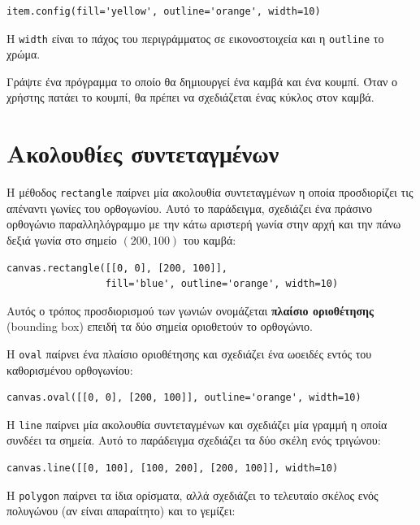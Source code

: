 \documentclass[10pt]{book}
\begin{document}
\begin{verbatim}
item.config(fill='yellow', outline='orange', width=10)
\end{verbatim}
%
Η {\tt width} είναι το πάχος του περιγράμματος σε εικονοστοιχεία και η  
{\tt outline} το χρώμα.
\\
\begin{exercise}
\label{circle}

Γράψτε ένα πρόγραμμα το οποίο θα δημιουργεί ένα καμβά και ένα κουμπί.  Όταν ο χρήστης 
πατάει το κουμπί, θα πρέπει να σχεδιάζεται ένας κύκλος στον καμβά.
\end{exercise}



\section{Ακολουθίες συντεταγμένων}

Η μέθοδος {\tt rectangle} παίρνει μία ακολουθία συντεταγμένων η οποία προσδιορίζει 
τις απέναντι γωνίες του ορθογωνίου.  Αυτό το παράδειγμα, σχεδιάζει ένα πράσινο ορθογώνιο 
παραλληλόγραμμο	με την κάτω αριστερή γωνία στην αρχή και την πάνω δεξιά γωνία στο σημείο 
$(200,100)$ του καμβά:

\begin{verbatim}
canvas.rectangle([[0, 0], [200, 100]],
                 fill='blue', outline='orange', width=10)
\end{verbatim}
%
Αυτός ο τρόπος προσδιορισμού των γωνιών ονομάζεται {\bf πλαίσιο οριοθέτησης} (bounding box)
επειδή τα δύο σημεία οριοθετούν το ορθογώνιο.

Η {\tt oval} παίρνει ένα πλαίσιο οριοθέτησης και σχεδιάζει ένα ωοειδές 
εντός του καθορισμένου ορθογωνίου:

\begin{verbatim}
canvas.oval([[0, 0], [200, 100]], outline='orange', width=10)
\end{verbatim}
%
Η {\tt line} παίρνει μία ακολουθία συντεταγμένων και σχεδιάζει μία γραμμή
η οποία συνδέει τα σημεία. Αυτό το παράδειγμα σχεδιάζει τα δύο σκέλη ενός τριγώνου:

\begin{verbatim}
canvas.line([[0, 100], [100, 200], [200, 100]], width=10)
\end{verbatim}
%
Η {\tt polygon} παίρνει τα ίδια ορίσματα, αλλά σχεδιάζει το τελευταίο σκέλος 
ενός πολυγώνου (αν είναι απαραίτητο) και το γεμίζει:
\end{document}
